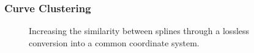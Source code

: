 


\subsubsection{Curve Clustering} \label{contributions:fem:curves}
\begin{figure}
\centering
{}
\caption{Increasing the similarity between splines through a lossless conversion into a common coordinate system.}
\label{contributions:fem:splines}
\end{figure}

